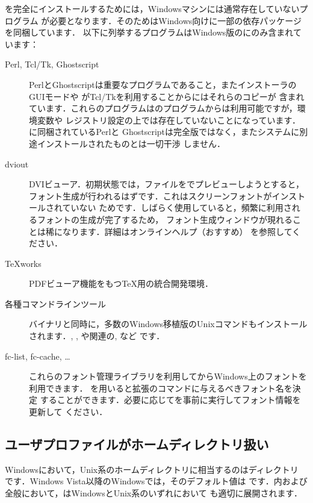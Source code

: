\documentclass[uplatex,dvipdfmx,tombow]{jsarticle}
\begin{document}
\TL を完全にインストールするためには，Windowsマシンには通常存在していないプログラム
が必要となります．そのため\TL はWindows向けに一部の依存パッケージを同梱しています．
以下に列挙するプログラムはWindows版の\TL にのみ含まれています：
%
\begin{description}
\item[Perl, Tcl/Tk, Ghostscript]
PerlとGhostscriptは重要なプログラムであること，また\TL インストーラのGUIモードや
がTcl/Tkを利用することから\TL にはそれらのコピーが
含まれています．これらのプログラムは\TL のプログラムからは利用可能ですが，環境変数や
レジストリ設定の上では存在していないことになっています．\TL に同梱されているPerlと
Ghostscriptは完全版ではなく，またシステムに別途インストールされたものとは一切干渉
しません．

\item[dviout]
DVIビューア．初期状態では，ファイルをでプレビューしようとすると，
フォント生成が行われるはずです．これはスクリーンフォントがインストールされていない
ためです．しばらく使用していると，頻繁に利用されるフォントの生成が完了するため，
フォント生成ウィンドウが現れることは稀になります．詳細はオンラインヘルプ（おすすめ）
を参照してください．

\item[\TeX works]
PDFビューア機能をもつ\TeX 用の統合開発環境．

\item[各種コマンドラインツール]
\TL バイナリと同時に，多数のWindows移植版のUnixコマンドもインストールされます．, , や関連の, など
です．

\item[fc-list, fc-cache, \ldots]
これらのフォント管理ライブラリを利用して\XeTeX からWindows上のフォントを利用できます．
を用いると\XeTeX 拡張のコマンドに与えるべきフォント名を決定
することができます．必要に応じてを事前に実行してフォント情報を更新して
ください．
\end{description}

\subsection{ユーザプロファイルがホームディレクトリ扱い}
\label{sec:winhome}

Windowsにおいて，Unix系のホームディレクトリに相当するのはディレクトリ
です．Windows Vista以降のWindowsでは，そのデフォルト値は%
です．内および\KPS 全般において，\dir{~}はWindowsとUnix系のいずれにおいて
も適切に展開されます．
\end{document}
